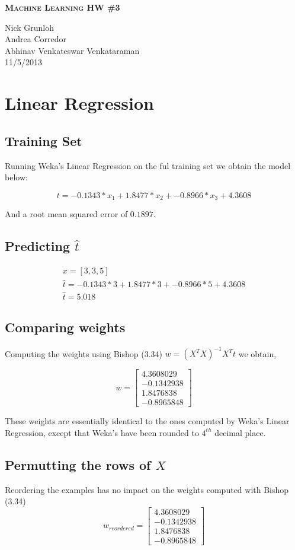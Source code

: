 \documentclass{article}
\newcommand{\header}[5]{
        \begin{minipage}[h!]{0.63\textwidth}
                \centering
                { \LARGE \textbf{ \textsc{#1} } }
        \end{minipage}
        \begin{minipage}[h!]{0.37\textwidth}
                \centering
                {#2}\\
                {#3}\\
        \end{minipage}
}
\begin{document}
\header{Machine Learning HW \#3}
       {Nick Grunloh\\Andrea Corredor\\Abhinav Venkateswar Venkataraman}
       {11/5/2013}
\\\\


\section{Linear Regression}

\subsection*{Training Set}
Running Weka's Linear Regression on the ful training set we obtain the model below:

 \[ t =    -0.1343 * x_{1} +  1.8477 * x_{2} + -0.8966 * x_{3} + 4.3608 \]

\noindent And a root mean squared error of $0.1897$. 

\subsection*{Predicting $\hat{t}$}

\begin{align*}
 x = [3,3,5]  \\
 \hat{t} = -0.1343 * 3 +  1.8477 * 3 + -0.8966 * 5 + 4.3608  \\
\hat{t} = 5.018 
\end{align*}

\subsection*{Comparing weights}
Computing the weights using Bishop (3.34) $ w = (X^{T}X)^{-1}X^{T}t$  we obtain,

\[w = \begin{bmatrix}
       4.3608029  \\[0.3em]
       -0.1342938  \\[0.3em]
       1.8476838 \\[0.3em]
       -0.8965848
     \end{bmatrix} \]

These weights are essentially identical to the ones computed by Weka's Linear Regression, except that Weka's have been rounded to $4^{th}$ decimal place.

\subsection*{Permutting the rows of $X$}
Reordering the examples has no impact on the weights computed with Bishop (3.34)
\[w_{reordered} = \begin{bmatrix}
       4.3608029  \\[0.3em]
       -0.1342938  \\[0.3em]
       1.8476838 \\[0.3em]
       -0.8965848
     \end{bmatrix} \]
\end{document}
